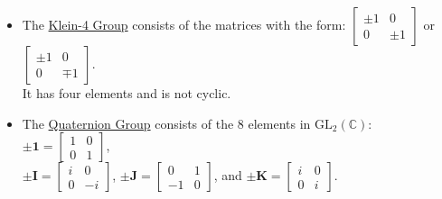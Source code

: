 \documentclass{book}
\newcommand{\hOne}{%
   \color{Black}%
   \fontsize{14}{16}\selectfont%
}
\newcommand{\udefine}[1]{{%
   \setulcolor{Red}%
   \setul{0.14em}{0.07em}%
   \ul{#1}%
}}
\newcommand{\mySepTwo}[1][.]{%
   {\noindent\color{#1}{\rule{6.5in}{0.5mm}}}\\%
}
\newcommand{\retTwo}{\hfill\bigbreak}
\begin{document}
\begin{itemize}
	\item The \udefine{Klein-4 Group} consists of the matrices with the form: $
	\left[\begin{smallmatrix}
		\pm 1 & 0 \\ 0 & \pm 1
	\end{smallmatrix}\right]$ or $
	\left[\begin{smallmatrix}
		\pm 1 & 0 \\ 0 & \mp 1
	\end{smallmatrix}\right]$.\\ [-16pt]

	It has four elements and is not cyclic.\retTwo

	\item The \udefine{Quaternion Group} consists of the 8 elements in $\mathrm{GL}_2(\mathbb{C})$: $\pm \bm{1} = \left[\begin{smallmatrix}
		 1 & 0 \\ 0 & 1
	\end{smallmatrix}\right]$,\\ $\pm \bm{I} = 
	\left[\begin{smallmatrix}
		i & 0 \\ 0 & -i
	\end{smallmatrix}\right]$, $\pm \bm{J} = 
	\left[\begin{smallmatrix}
		0 & 1 \\ -1 & 0
	\end{smallmatrix}\right]$, and $\pm \bm{K} = 
	\left[\begin{smallmatrix}
		 i & 0 \\ 0 & i
	\end{smallmatrix}\right]$.
\end{itemize}

\hOne

\mySepTwo
\end{document}
